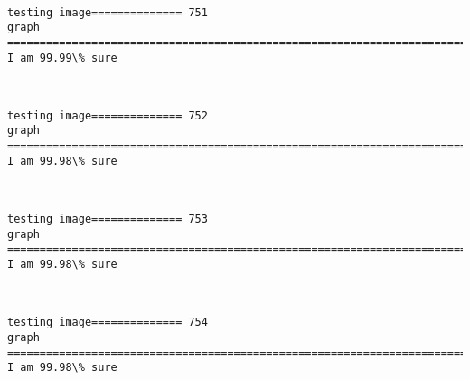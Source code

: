 \documentclass[11pt]{article}
\begin{document}
    \begin{center}
    \end{center}
    { \hspace*{\fill} \\}
    
    \begin{Verbatim}[commandchars=\\\{\}]
testing image============== 751
graph
============================================================================
I am 99.99\% sure

    \end{Verbatim}

    \begin{center}
    \end{center}
    { \hspace*{\fill} \\}
    
    \begin{Verbatim}[commandchars=\\\{\}]
testing image============== 752
graph
============================================================================
I am 99.98\% sure

    \end{Verbatim}

    \begin{center}
    \end{center}
    { \hspace*{\fill} \\}
    
    \begin{Verbatim}[commandchars=\\\{\}]
testing image============== 753
graph
============================================================================
I am 99.98\% sure

    \end{Verbatim}

    \begin{center}
    \end{center}
    { \hspace*{\fill} \\}
    
    \begin{Verbatim}[commandchars=\\\{\}]
testing image============== 754
graph
============================================================================
I am 99.98\% sure

    \end{Verbatim}
\end{document}
